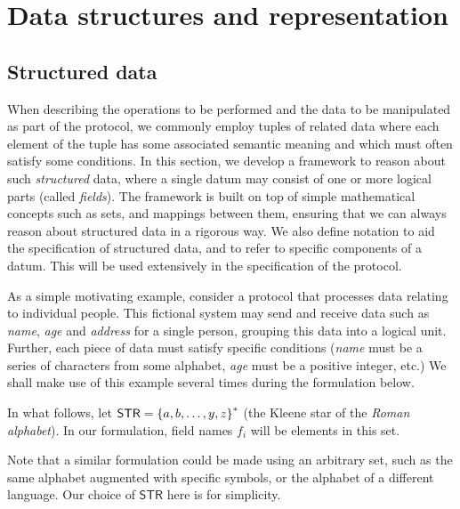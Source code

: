 
\section{Data structures and representation}\label{preliminaries:structured-data}

\newcommand{\STR}{\mathsf{STR}}

\subsection{Structured data}\label{preliminaries:data-types:formulation}

When describing the operations to be performed and the data to be manipulated as part of the protocol, we commonly employ tuples of related data where each element of the tuple has some associated semantic meaning and which must often satisfy some conditions. In this section, we develop a framework to reason about such \emph{structured} data, where a single datum may consist of one or more logical parts (called \emph{fields}). The framework is built on top of simple mathematical concepts such as sets, and mappings between them, ensuring that we can always reason about structured data in a rigorous way. We also define notation to aid the specification of structured data, and to refer to specific components of a datum. This will be used extensively in the specification of the protocol.

As a simple motivating example, consider a protocol that processes data relating to individual people. This fictional system may send and receive data such as \emph{name}, \emph{age} and \emph{address} for a single person, grouping this data into a logical unit. Further, each piece of data must satisfy specific conditions (\emph{name} must be a series of characters from some alphabet, \emph{age} must be a positive integer, etc.) We shall make use of this example several times during the formulation below.

In what follows, let $\STR = \smallset{a, b, \ldots, y, z}^{*}$ (the Kleene star of the \emph{Roman alphabet}). In our formulation, field names $f_i$ will be elements in this set.

\begin{remark}
  Note that a similar formulation could be made using an arbitrary set, such as the same alphabet augmented with specific symbols, or the alphabet of a different language. Our choice of $\STR{}$ here is for simplicity.
\end{remark}

